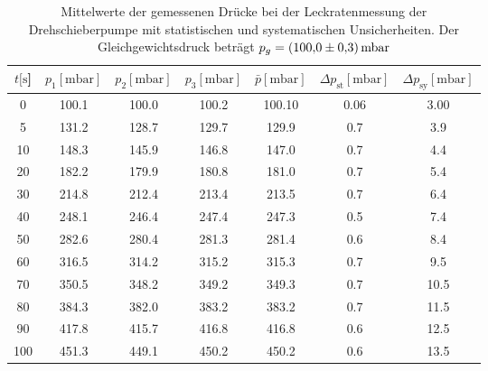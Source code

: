 %
\begin{table}[H]
  \centering
    \caption{Mittelwerte der gemessenen Drücke bei der Leckratenmessung der Drehschieberpumpe mit statistischen und systematischen Unsicherheiten. Der Gleichgewichtsdruck beträgt $p_g=\SI{100 \pm 0.3}{\milli\bar}$}
    \label{tab:Dreh_Leck4}
    \begin{tabular}{
      S[table-format=3.0] 
      S[table-format=3.1] S[table-format=3.1] S[table-format=3.1]
      S[table-format=3.2] S[table-format=1.2] S[table-format=2.0]
      }
      \toprule
      {$t [\si{\second}$]} &
      {$p_1 [\si{\milli\bar}]$} & {$p_2 [\si{\milli\bar}]$} & {$p_3 [\si{\milli\bar}]$} &
      {$\bar{p} [\si{\milli\bar}]$} & {$\Delta p_\text{st} [\si{\milli\bar}]$} & {$\Delta p_\text{sy} [\si{\milli\bar}]$}\\
         & 100.1 & 100.0 & 100.2 & 100.10 & 0.06 & 3.00 \\
      5   & 131.2 & 128.7 & 129.7 & 129.9  & 0.7  & 3.9  \\
      10  & 148.3 & 145.9 & 146.8 & 147.0  & 0.7  & 4.4  \\
      20  & 182.2 & 179.9 & 180.8 & 181.0  & 0.7  & 5.4  \\
      30  & 214.8 & 212.4 & 213.4 & 213.5  & 0.7  & 6.4  \\
      40  & 248.1 & 246.4 & 247.4 & 247.3  & 0.5  & 7.4  \\
      50  & 282.6 & 280.4 & 281.3 & 281.4  & 0.6  & 8.4  \\
      60  & 316.5 & 314.2 & 315.2 & 315.3  & 0.7  & 9.5  \\
      70  & 350.5 & 348.2 & 349.2 & 349.3  & 0.7  & 10.5 \\
      80  & 384.3 & 382.0 & 383.2 & 383.2  & 0.7  & 11.5 \\
      90  & 417.8 & 415.7 & 416.8 & 416.8  & 0.6  & 12.5 \\
      100 & 451.3 & 449.1 & 450.2 & 450.2  & 0.6  & 13.5 \\
      \bottomrule
    \end{tabular}
\end{table}
\noindent
